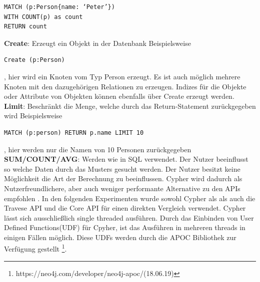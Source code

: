 \begin{Verbatim}[frame=single]
MATCH (p:Person{name: ‘Peter’})  
WITH COUNT(p) as count  
RETURN count
\end{Verbatim} 
\textbf{Create}: Erzeugt ein Objekt in der Datenbank Beispielsweise 
\begin{Verbatim}[frame=single]
Create (p:Person)
\end{Verbatim}
, hier wird ein Knoten vom Typ Person erzeugt. Es ist auch möglich mehrere Knoten mit den dazugehörigen Relationen zu erzeugen. Indizes  für die Objekte oder Attribute von Objekten können ebenfalls über Create erzeugt werden.\newline
\textbf{Limit}: Beschränkt die Menge, welche durch das Return-Statement zurückgegeben wird Beispielsweise
\begin{Verbatim}[frame=single]
MATCH (p:person) RETURN p.name LIMIT 10
\end{Verbatim} 
, hier werden nur die Namen  von 10 Personen zurückgegeben\newline
\textbf{SUM/COUNT/AVG}: Werden wie in SQL verwendet. \newline
Der Nutzer beeinflusst so welche Daten durch  das Musters gesucht werden. Der Nutzer besitzt keine Möglichkeit die Art der Berechnung zu beeinflussen. Cypher wird dadurch als Nutzerfreundlichere, aber auch weniger performante Alternative zu den APIs empfohlen \parencite{vukotic2015neo4j}. In den folgenden Experimenten wurde sowohl Cypher als als auch die Travese API und die Core API für einen direkten Vergleich verwendet. Cypher lässt sich ausschließlich  single threaded ausführen. Durch das Einbinden von User Defined Functions(UDF) für Cpyher, ist das Ausführen in mehreren threads in einigen Fällen möglich. Diese UDFs werden durch die APOC Bibliothek zur Verfügung gestellt \footnote{https://neo4j.com/developer/neo4j-apoc/(18.06.19)}.

